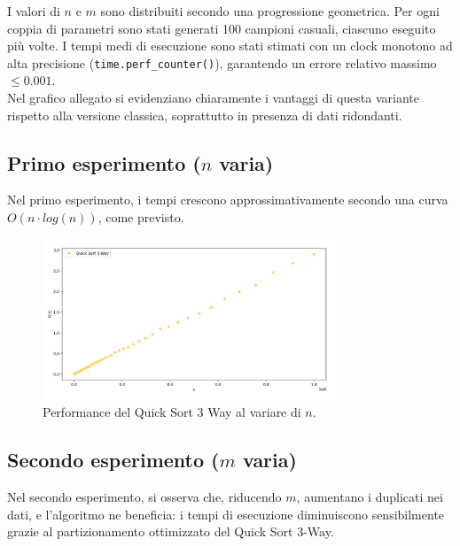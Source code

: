 \documentclass[a4paper, 12pt, oneside]{book}
\begin{document}
\noindent
I valori di \(n\) e \(m\) sono distribuiti secondo una progressione geometrica. Per ogni coppia di parametri sono stati generati 100 campioni casuali, ciascuno eseguito più volte. I tempi medi di esecuzione sono stati stimati con un clock monotono ad alta precisione (\texttt{time.perf\_counter()}), garantendo un errore relativo massimo \(\leq 0.001\). \\


\noindent
Nel grafico allegato si evidenziano chiaramente i vantaggi di questa variante rispetto alla versione classica, soprattutto in presenza di dati ridondanti.

\subsection{Primo esperimento ($n$ varia)}

Nel primo esperimento, i tempi crescono approssimativamente secondo una curva \(O(n \cdot log(n))\), come previsto.


\begin{figure}[H]
    \centering
    \includegraphics[width=0.8\textwidth]{images/grafico_quick_sort_3_way_n.png}
    \caption{Performance del Quick Sort 3 Way al variare di \(n\).}
    \label{fig:quick_sort_3_way_n}
\end{figure}



\subsection{Secondo esperimento ($m$ varia)}

Nel secondo esperimento, si osserva che, riducendo \(m\), aumentano i duplicati nei dati, e l'algoritmo ne beneficia: i tempi di esecuzione diminuiscono sensibilmente grazie al partizionamento ottimizzato del Quick Sort 3-Way.
\end{document}
